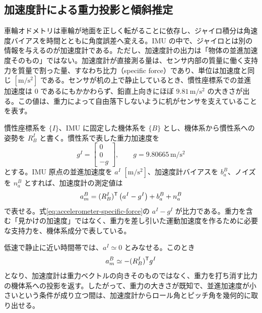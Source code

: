 \subsection{加速度計による重力投影と傾斜推定}

車輪オドメトリは車輪が地面を正しく転がることに依存し、ジャイロ積分は角速度バイアスを時間とともに角度誤差へ変える。IMU の中で、ジャイロとは別の情報を与えるのが加速度計である。ただし、加速度計の出力は「物体の並進加速度そのもの」ではない。加速度計が直接測る量は、センサ内部の質量に働く支持力を質量で割った量、すなわち比力（specific force）であり、単位は加速度と同じ $[\mathrm{m/s^2}]$ である。センサが机の上で静止しているとき、慣性座標系での並進加速度は 0 であるにもかかわらず、鉛直上向きにほぼ $9.81\,\mathrm{m/s^2}$ の大きさが出る。この値は、重力によって自由落下しないように机がセンサを支えていることを表す。

慣性座標系を $\{I\}$、IMU に固定した機体系を $\{B\}$ とし、機体系から慣性系への姿勢を $R^I_B$ と書く。慣性系で表した重力加速度を
\begin{equation}
  g^I=\begin{bmatrix}0\\0\\-g\end{bmatrix},
  \qquad
  g=9.80665\,\mathrm{m/s^2}
\end{equation}
とする。IMU 原点の並進加速度を $a^I$ $[\mathrm{m/s^2}]$、加速度計バイアスを $b_a^B$、ノイズを $n_a^B$ とすれば、加速度計の測定値は
\begin{equation}
  a_m^B
  =
  (R^I_B)^{\mathsf{T}}\left(a^I-g^I\right)+b_a^B+n_a^B
  \label{eq:accelerometer-specific-force}
\end{equation}
で表せる。式\eqref{eq:accelerometer-specific-force}の $a^I-g^I$ が比力である。重力を含む「見かけの加速度」ではなく、重力を差し引いた運動加速度を作るために必要な支持力を、機体系成分で表している。

低速で静止に近い時間帯では、$a^I\simeq0$ とみなせる。このとき
\begin{equation}
  a_m^B\simeq -(R^I_B)^{\mathsf{T}} g^I
\end{equation}
となり、加速度計は重力ベクトルの向きそのものではなく、重力を打ち消す比力の機体系への投影を返す。したがって、重力の大きさが既知で、並進加速度が小さいという条件が成り立つ間は、加速度計からロール角とピッチ角を幾何的に取り出せる。

